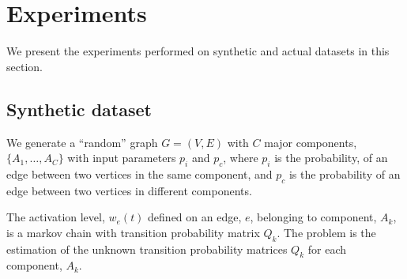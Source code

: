 \documentclass{bioinfo}
\begin{document}
\begin{methods}



\end{methods}
\section{Experiments}
We present the experiments performed on synthetic and actual datasets
in this section. 
\subsection{Synthetic dataset}
We generate a ``random'' graph $G=(V, E)$ with $C$ major components,
$\{A_1,\ldots, A_C\}$ with input parameters $p_{i}$ and $p_{c}$,
where $p_{i}$ is the probability, of an edge between two vertices in
the same component,  and $p_c$ is the probability of an edge between
two vertices in different components.  

The activation level, $w_e(t)$ defined on an edge, $e$, belonging to
component, $A_k$, is a markov chain with transition probability matrix
$Q_{k}$. The problem is the estimation of the unknown transition probability
matrices $Q_k$ for each component, $A_k$. 
\end{document}
